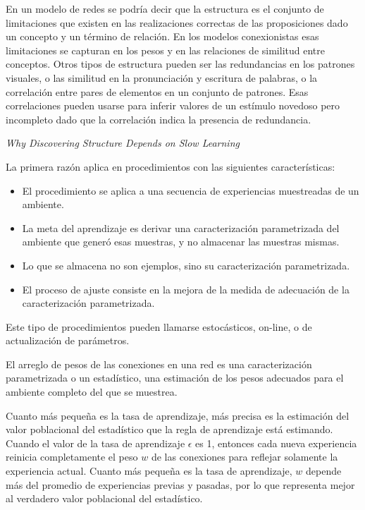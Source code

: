 \documentclass[a4paper,12pt]{article}
\begin{document}
En un modelo de redes se podría decir que la estructura es el conjunto de limitaciones que existen en las realizaciones correctas de las proposiciones dado un concepto y un término de relación. En los modelos conexionistas esas limitaciones se capturan en los pesos y en las relaciones de similitud entre conceptos. Otros tipos de estructura pueden ser las redundancias en los patrones visuales, o las similitud en la pronunciación y escritura de palabras, o la correlación entre pares de elementos en un conjunto de patrones. Esas correlaciones pueden usarse para inferir valores de un estímulo novedoso pero incompleto dado que la correlación indica la presencia de redundancia.

{\itshape Why Discovering Structure Depends on Slow Learning}

La primera razón aplica en procedimientos con las siguientes características:
\begin{itemize}
	\item El procedimiento se aplica a una secuencia de experiencias muestreadas de un ambiente.
	\item La meta del aprendizaje es derivar una caracterización parametrizada del ambiente que generó esas muestras, y no almacenar las muestras mismas.
	\item Lo que se almacena no son ejemplos, sino su caracterización parametrizada.
	\item El proceso de ajuste consiste en la mejora de la medida de adecuación de la caracterización parametrizada.
\end{itemize}

Este tipo de procedimientos pueden llamarse estocásticos, on-line, o de actualización de parámetros.

El arreglo de pesos de las conexiones en una red es una caracterización parametrizada o un estadístico, una estimación de los pesos adecuados para el ambiente completo del que se muestrea.

Cuanto más pequeña es la tasa de aprendizaje, más precisa es la estimación del valor poblacional del estadístico que la regla de aprendizaje está estimando. Cuando el valor de la tasa de aprendizaje $\epsilon$ es 1, entonces cada nueva experiencia reinicia completamente el peso $w$ de las conexiones para reflejar solamente la experiencia actual. Cuanto más pequeña es la tasa de aprendizaje, $w$ depende más del promedio de experiencias previas y pasadas, por lo que representa mejor al verdadero valor poblacional del estadístico.
\end{document}
